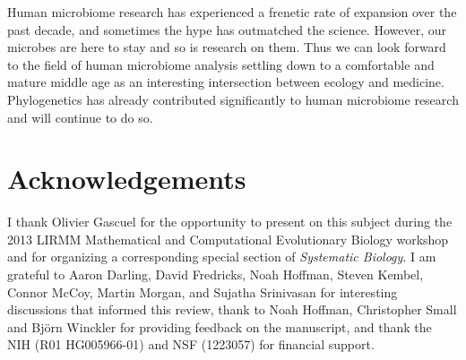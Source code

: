 \documentclass{amsart}
\newcommand{\notforarxiv}[1]{}
\begin{document}
Human microbiome research has experienced a frenetic rate of expansion over the past decade, and sometimes the hype has outmatched the science.
However, our microbes are here to stay and so is research on them.
Thus we can look forward to the field of human microbiome analysis settling down to a comfortable and mature middle age as an interesting intersection between ecology and medicine.
Phylogenetics has already contributed significantly to human microbiome research and will continue to do so.



\section{Acknowledgements}
I thank Olivier Gascuel for the opportunity to present on this subject during the 2013 LIRMM Mathematical and Computational Evolutionary Biology workshop and for organizing a corresponding special section of \textit{Systematic Biology}.
I am grateful to Aaron Darling, David Fredricks, Noah Hoffman, Steven Kembel, Connor McCoy, Martin Morgan, and Sujatha Srinivasan for interesting discussions that informed this review, thank to Noah Hoffman, Christopher Small and Bj\"orn Winckler for providing feedback on the manuscript, and thank the NIH (R01 HG005966-01) and NSF (1223057) for financial support.


\notforarxiv{
\newpage
\section{Figure Legends}

\noindent
Figure 1: \unifracLegend

\noindent
Figure 2: \dirtpilesLegend

\clearpage

\newpage
}



\end{document}
